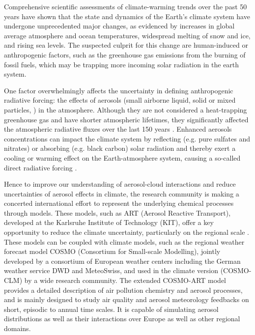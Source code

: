 Comprehensive  scientific assessments  of climate-warming  trends over
the  past 50  years have  shown  that the  state and  dynamics of  the
Earth's climate system have  undergone unprecedented major changes, as
evidenced  by  increases  in   global  average  atmosphere  and  ocean
temperatures,  widespread melting  of  snow and  ice,  and rising  sea
levels.  The suspected culprit for this change are human-induced or anthropogenic
factors, such as the greenhouse gas emissions from the burning of 
fossil fuels, which may be trapping more incoming solar radiation
in the earth system.

One  factor   overwhelmingly  affects  the   uncertainty  in  defining
anthropogenic  radiative  forcing:  the  effects  of  aerosols  (small
airborne liquid,  solid or mixed  particles, \citealp{Putaud-2010}) in
the  atmosphere.  Although  they  are not  considered a  heat-trapping
greenhouse   gas  and   have  shorter   atmospheric   lifetimes,  they
significantly affected the atmospheric  radiative fluxes over the last
150    years   \citep{Koch-2009,   IPCC-2013}.     Enhanced   aerosols
concentrations can impact the climate system by reflecting (e.g.  pure
sulfates  and  nitrates)  or  absorbing  (e.g.   black  carbon)  solar
radiation  and  thereby exert  a  cooling  or  warming effect  on  the
Earth-atmosphere   system,  causing   a  so-called   direct  radiative
forcing     \citep{Charlson-1991,    Haywood-2000,    Ramanathan-2001,
Liao-2005,  Bangert-2012,  Lundgren-2013}.  

Hence to  improve our understanding of  aerosol-cloud interactions and
reduce  uncertainties  of aerosol  effects  in  climate, the  research
community is making a  concerted international effort to represent the
underlying chemical  processes through models.  These  models, such as
ART (Aerosol Reactive Transport), developed  at the
Karlsruhe Institute  of Technology (KIT),  offer a key  opportunity to
reduce   the  climate  uncertainty,   particularly  on   the  regional
scale \citep{Knote-2011, Bangert-2011,  Knote-2013}.  These models can
be coupled with climate models,  such as the regional weather forecast
model COSMO (Consortium  for Small-scale Modelling), jointly developed
by  a consortium  of  European weather  centers  including the  German
weather service  DWD and MeteoSwiss,  and used in the  climate version
(COSMO-CLM)  by a  wide  research community.   The extended  COSMO-ART
model provides  a detailed description of air  pollution chemistry and
aerosol processes,  and is  mainly designed to  study air  quality and
aerosol  meteorology  feedbacks  on  short, episodic  to  annual  time
scales.  It is capable of  simulating aerosol distributions as well as
their interactions over Europe as well as other regional domains.

